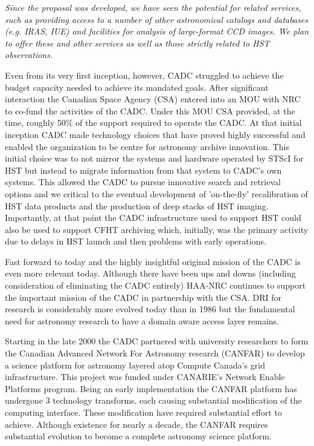 \documentclass[11pt]{article}
\begin{document}
{\it Since the proposal was developed, we have seen the potential for related services, such as providing access to a number of other astronomical catalogs and databases (e.g. IRAS, IUE) and facilities for analysis of large-format CCD images. We plan to offer these and other services as well as those strictly related to HST observations.}

Even from its very first inception, however, CADC struggled to achieve the budget capacity needed to achieve its mandated goals.  After significant interaction the Canadian Space Agency (CSA) entered into an MOU with NRC to co-fund the activities of the CADC. Under this MOU CSA provided, at the time, roughly 50\% of the support required to operate the CADC.   
At that initial inception CADC made technology choices that have proved highly successful and enabled the organization to be centre for astronomy archive innovation. This initial choice was to not mirror the systems and hardware operated by STScI for HST but instead to migrate information from that system to CADC's own systems. This allowed the CADC to pursue innovative search and retrieval options and we critical to the eventual development of 'on-the-fly' recalibration of HST data products and the production of deep stacks of HST imaging.  Importantly, at that point the CADC infrastructure used to support HST could also be used to support CFHT archiving which, initially, was the primary activity due to delays in HST launch and then problems with early operations. 

Fast forward to today and the highly insightful  original mission of the CADC is even more relevant today.  Although there have been ups and downs (including consideration of eliminating the CADC entirely) HAA-NRC continues to support the important mission of the CADC in partnership with the CSA. 
DRI for research is considerably more evolved today than in 1986 but the fundamental need for astronomy research to have a domain aware access layer remains. 

Starting in the late 2000 the CADC partnered with university researchers to form the Canadian Advanced Network For Astronomy research (CANFAR) to develop a science platform for astronomy layered atop Compute Canada's grid infrastructure.  This project was funded under CANARIE's Network Enable Platforms program.  Being an early implementation the CANFAR platform has undergone 3 technology transforms, each causing substantial modification of the computing interface.  These modification have required substantial effort to achieve.  Although existence for nearly a decade, the CANFAR requires substantial evolution to become a complete astronomy science platform. 
\end{document}
